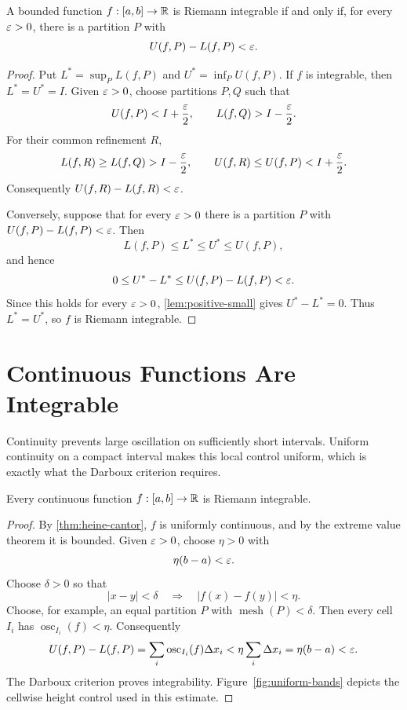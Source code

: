\begin{proposition}
\label{prop:darboux-criterion}
A bounded function $f:[a,b]\to\mathbb{R}$ is Riemann integrable if and only if, for every $\varepsilon>0$, there is a partition $P$ with
\[
U(f,P)-L(f,P)<\varepsilon.
\]
\end{proposition}
\begin{proof}
Put $L^*=\sup_P L(f,P)$ and $U^*=\inf_P U(f,P)$.  If $f$ is integrable,
then $L^*=U^*=I$.  Given $\varepsilon>0$, choose partitions $P,Q$ such that
\[
U(f,P)<I+\frac{\varepsilon}{2},
\qquad
L(f,Q)>I-\frac{\varepsilon}{2}.
\]
For their common refinement $R$,
\[
L(f,R)\geq L(f,Q)>I-\frac{\varepsilon}{2},
\qquad
U(f,R)\leq U(f,P)<I+\frac{\varepsilon}{2}.
\]
Consequently $U(f,R)-L(f,R)<\varepsilon$.

Conversely, suppose that for every $\varepsilon>0$ there is a partition $P$ with
$U(f,P)-L(f,P)<\varepsilon$.  Then
\[
L(f,P)\leq L^*\leq U^*\leq U(f,P),
\]
and hence
\[
0\leq U^*-L^*\leq U(f,P)-L(f,P)<\varepsilon.
\]
Since this holds for every $\varepsilon>0$, \cref{lem:positive-small} gives
$U^*-L^*=0$.  Thus $L^*=U^*$, so $f$ is Riemann integrable.
\end{proof}

\section{Continuous Functions Are Integrable}

Continuity prevents large oscillation on sufficiently short intervals.
Uniform continuity on a compact interval makes this local control uniform,
which is exactly what the Darboux criterion requires.

\begin{theorem}
\label{thm:continuous-riemann-integrable}
Every continuous function $f:[a,b]\to\mathbb{R}$ is Riemann integrable.
\end{theorem}
\begin{proof}
By \cref{thm:heine-cantor}, $f$ is uniformly continuous, and by the
extreme value theorem it is bounded. Given $\varepsilon>0$, choose $\eta>0$ with
\[
\eta(b-a)<\varepsilon.
\]
Choose $\delta>0$ so that
\[
|x-y|<\delta\quad\Longrightarrow\quad |f(x)-f(y)|<\eta.
\]
Choose, for example, an equal partition $P$ with
$\operatorname{mesh}(P)<\delta$. Then every cell $I_i$ has
$\operatorname{osc}_{I_i}(f)<\eta$. Consequently
\[
U(f,P)-L(f,P)=\sum_i\operatorname{osc}_{I_i}(f)\Delta x_i
<\eta\sum_i\Delta x_i=\eta(b-a)<\varepsilon.
\]
The Darboux criterion proves integrability. Figure~\ref{fig:uniform-bands}
depicts the cellwise height control used in this estimate.
\end{proof}

